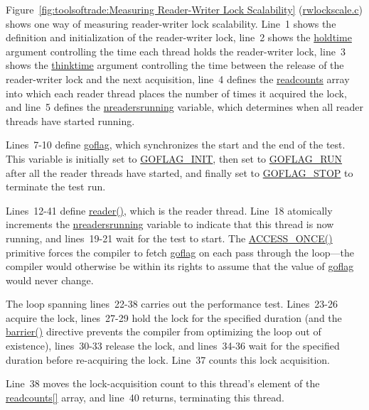 Figure~\ref{fig:toolsoftrade:Measuring Reader-Writer Lock Scalability}
(\url{rwlockscale.c})
shows one way of measuring reader-writer lock scalability.
Line~1 shows the definition and initialization of the reader-writer
lock, line~2 shows the \url{holdtime} argument controlling the
time each thread holds the reader-writer lock,
line~3 shows the \url{thinktime} argument controlling the time between
the release of the reader-writer lock and the next acquisition,
line~4 defines the \url{readcounts} array into which each reader thread
places the number of times it acquired the lock, and
line~5 defines the \url{nreadersrunning} variable, which
determines when all reader threads have started running.

Lines~7-10 define \url{goflag}, which synchronizes the start and the
end of the test.
This variable is initially set to \url{GOFLAG_INIT}, then set to
\url{GOFLAG_RUN} after all the reader threads have started, and finally
set to \url{GOFLAG_STOP} to terminate the test run.

Lines~12-41 define \url{reader()}, which is the reader thread.
Line~18 atomically increments the \url{nreadersrunning} variable
to indicate that this thread is now running, and
lines~19-21 wait for the test to start.
The \url{ACCESS_ONCE()} primitive forces the compiler to fetch \url{goflag}
on each pass through the loop---the compiler would otherwise be within its
rights to assume that the value of \url{goflag} would never change.

The loop spanning lines~22-38 carries out the performance test.
Lines~23-26 acquire the lock, lines~27-29 hold the lock for the specified
duration (and the \url{barrier()} directive prevents the compiler from
optimizing the loop out of existence), lines~30-33 release the lock,
and lines~34-36 wait for the specified duration before re-acquiring the
lock.
Line~37 counts this lock acquisition.

Line~38 moves the lock-acquisition count to this thread's element of the
\url{readcounts[]} array, and line~40 returns, terminating this thread.

